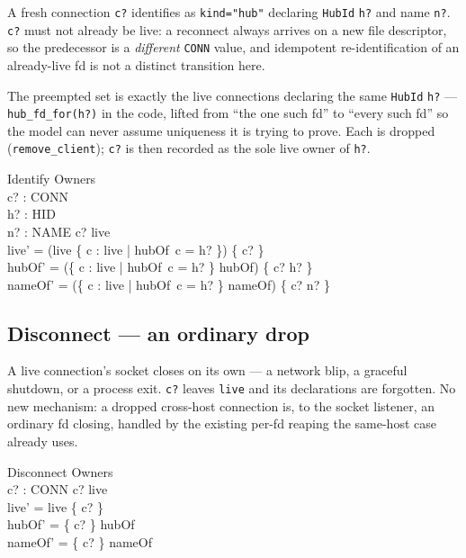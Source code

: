 \documentclass[a4paper,10pt,fleqn]{article}
\begin{document}
A fresh connection \texttt{c?} identifies as \texttt{kind="hub"} declaring
\texttt{HubId} \texttt{h?} and name \texttt{n?}.  \texttt{c?} must not
already be live: a reconnect always arrives on a new file descriptor, so
the predecessor is a \emph{different} \texttt{CONN} value, and idempotent
re-identification of an already-live fd is not a distinct transition here.

The preempted set is exactly the live connections declaring the same
\texttt{HubId} \texttt{h?} --- \texttt{hub\_fd\_for(h?)} in the code,
lifted from ``the one such fd'' to ``every such fd'' so the model can
never assume uniqueness it is trying to prove.  Each is dropped
(\texttt{remove\_client}); \texttt{c?} is then recorded as the sole live
owner of \texttt{h?}.

\begin{schema}{Identify}
  \Delta Owners \\
  c? : CONN \\
  h? : HID \\
  n? : NAME
\where
  c? \notin live \\
  live' = (live \setminus \{ c : live | hubOf~c = h? \}) \cup \{ c? \} \\
  hubOf' = (\{ c : live | hubOf~c = h? \} \ndres hubOf) \oplus \{ c? \mapsto h? \} \\
  nameOf' = (\{ c : live | hubOf~c = h? \} \ndres nameOf) \oplus \{ c? \mapsto n? \}
\end{schema}

\subsection{Disconnect --- an ordinary drop}

A live connection's socket closes on its own --- a network blip, a
graceful shutdown, or a process exit.  \texttt{c?} leaves \texttt{live}
and its declarations are forgotten.  No new mechanism: a dropped
cross-host connection is, to the socket listener, an ordinary fd closing,
handled by the existing per-fd reaping the same-host case already uses.

\begin{schema}{Disconnect}
  \Delta Owners \\
  c? : CONN
\where
  c? \in live \\
  live' = live \setminus \{ c? \} \\
  hubOf' = \{ c? \} \ndres hubOf \\
  nameOf' = \{ c? \} \ndres nameOf
\end{schema}
\end{document}
